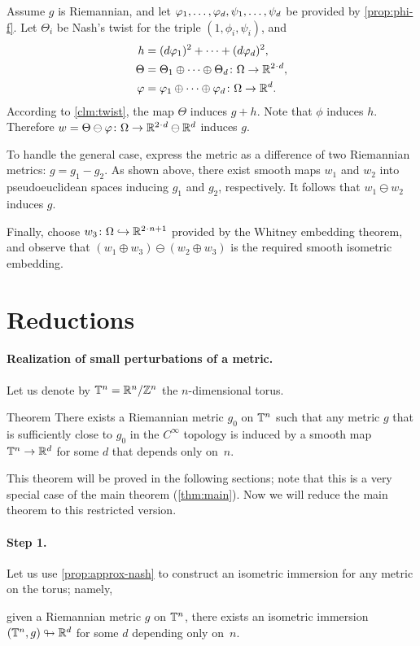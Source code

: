 Assume $g$ is Riemannian, and let $\phi_1,\z\dots,\phi_d,\psi_1,\z\dots,\psi_d$ be provided by \ref{prop:phi-f}.
Let $\Theta_i$ be Nash's twist for the triple $(1,\phi_i,\psi_i)$, and
\begin{align*}
h&=(d\phi_1)^2+\dots+(d\phi_d)^2,
\\
\Theta&=\Theta_1\oplus\dots\oplus \Theta_d\colon\Omega\to \RR^{2\cdot d},
\\
\phi&=\phi_1\oplus \dots\oplus \phi_d\colon\Omega\to \RR^{d}.
\end{align*}
According to \ref{clm:twist}, the map $\Theta$ induces $g+h$.
Note that $\phi$ induces $h$.
Therefore $w=\Theta\ominus \phi\colon\Omega\to \RR^{2\cdot d}\ominus\RR^d$ induces $g$.

To handle the general case, express the metric as a difference of two Riemannian metrics: $g = g_1 - g_2$.
As shown above, there exist smooth maps $w_1$ and $w_2$ into pseudoeuclidean spaces inducing $g_1$ and $g_2$, respectively.
It follows that $w_1 \ominus w_2$ induces $g$.

Finally, choose $w_3\colon\Omega\hookrightarrow \RR^{2\cdot n+1}$ provided by the Whitney embedding theorem, and observe that $(w_1 \oplus w_3)\ominus (w_2\oplus w_3)$ is the required smooth isometric embedding.
\qeds

\section{Reductions}\label{sec:Reductions}

\paragraph{Realization of small perturbations of a metric.}
Let us denote by $\mathbb{T}^n=\mathbb{R}^n/\mathbb{Z}^n$ the $n$-dimensional torus.

\begin{thm}{Theorem}\label{thm:restricted}
There exists a Riemannian metric $g_0$ on $\mathbb{T}^n$ such that
any metric $g$ that is sufficiently close to $g_0$ in the $C^\infty$ topology is induced by a smooth map $\mathbb{T}^n\to \mathbb{R}^d$ for some $d$ that depends only on~$n$.
\end{thm}

This theorem will be proved in the following sections;
note that this is a very special case of the main theorem (\ref{thm:main}).
Now we will reduce the main theorem to this restricted version.

\paragraph{Step 1.}
Let us use \ref{prop:approx-nash} to construct an isometric immersion for any metric on the torus; namely,
\begin{clm}{}
given a Riemannian metric $g$ on $\mathbb{T}^n$, there exists an isometric immersion $(\mathbb{T}^n, g) \looparrowright \mathbb{R}^d$ for some $d$ depending only on~$n$.
\end{clm}


